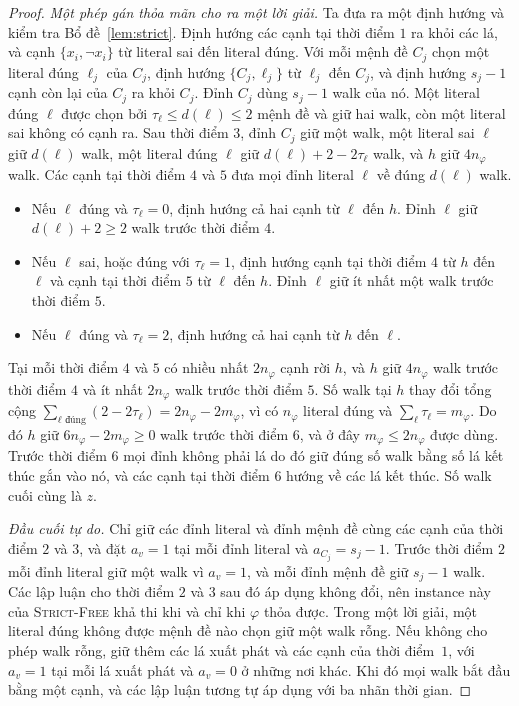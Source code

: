 \documentclass[pdflatex,sn-mathphys-num]{sn-jnl}
\theoremstyle{thmstyleone}%
\theoremstyle{thmstyletwo}%
\theoremstyle{thmstylethree}%
\newcommand{\SFREE}{\textup{\textsc{Strict-Free}}}
\begin{document}
\begin{proof}
\emph{Một phép gán thỏa mãn cho ra một lời giải.} Ta đưa ra một định hướng và kiểm tra Bổ đề~\ref{lem:strict}. Định hướng các cạnh tại thời điểm $1$ ra khỏi các lá, và cạnh $\{x_i,\lnot x_i\}$ từ literal sai đến literal đúng. Với mỗi mệnh đề $C_j$ chọn một literal đúng $\ell_j$ của $C_j$, định hướng $\{C_j,\ell_j\}$ từ $\ell_j$ đến $C_j$, và định hướng $s_j-1$ cạnh còn lại của $C_j$ ra khỏi $C_j$. Đỉnh $C_j$ dùng $s_j-1$ walk của nó. Một literal đúng $\ell$ được chọn bởi $\tau_\ell\le d(\ell)\le2$ mệnh đề và giữ hai walk, còn một literal sai không có cạnh ra. Sau thời điểm $3$, đỉnh $C_j$ giữ một walk, một literal sai $\ell$ giữ $d(\ell)$ walk, một literal đúng $\ell$ giữ $d(\ell)+2-2\tau_\ell$ walk, và $h$ giữ $4n_\varphi$ walk. Các cạnh tại thời điểm $4$ và $5$ đưa mọi đỉnh literal $\ell$ về đúng $d(\ell)$ walk.
\begin{itemize}
\item Nếu $\ell$ đúng và $\tau_\ell=0$, định hướng cả hai cạnh từ $\ell$ đến $h$. Đỉnh $\ell$ giữ $d(\ell)+2\ge2$ walk trước thời điểm $4$.
\item Nếu $\ell$ sai, hoặc đúng với $\tau_\ell=1$, định hướng cạnh tại thời điểm $4$ từ $h$ đến $\ell$ và cạnh tại thời điểm $5$ từ $\ell$ đến $h$. Đỉnh $\ell$ giữ ít nhất một walk trước thời điểm $5$.
\item Nếu $\ell$ đúng và $\tau_\ell=2$, định hướng cả hai cạnh từ $h$ đến $\ell$.
\end{itemize}
Tại mỗi thời điểm $4$ và $5$ có nhiều nhất $2n_\varphi$ cạnh rời $h$, và $h$ giữ $4n_\varphi$ walk trước thời điểm $4$ và ít nhất $2n_\varphi$ walk trước thời điểm $5$. Số walk tại $h$ thay đổi tổng cộng $\sum_{\ell\text{ đúng}}(2-2\tau_\ell)=2n_\varphi-2m_\varphi$, vì có $n_\varphi$ literal đúng và $\sum_\ell\tau_\ell=m_\varphi$. Do đó $h$ giữ $6n_\varphi-2m_\varphi\ge0$ walk trước thời điểm $6$, và ở đây $m_\varphi\le2n_\varphi$ được dùng. Trước thời điểm $6$ mọi đỉnh không phải lá do đó giữ đúng số walk bằng số lá kết thúc gắn vào nó, và các cạnh tại thời điểm $6$ hướng về các lá kết thúc. Số walk cuối cùng là $z$.

\emph{Đầu cuối tự do.} Chỉ giữ các đỉnh literal và đỉnh mệnh đề cùng các cạnh của thời điểm $2$ và $3$, và đặt $a_v=1$ tại mỗi đỉnh literal và $a_{C_j}=s_j-1$. Trước thời điểm $2$ mỗi đỉnh literal giữ một walk vì $a_v=1$, và mỗi đỉnh mệnh đề giữ $s_j-1$ walk. Các lập luận cho thời điểm $2$ và $3$ sau đó áp dụng không đổi, nên instance này của \SFREE{} khả thi khi và chỉ khi $\varphi$ thỏa được. Trong một lời giải, một literal đúng không được mệnh đề nào chọn giữ một walk rỗng. Nếu không cho phép walk rỗng, giữ thêm các lá xuất phát và các cạnh của thời điểm~$1$, với $a_v=1$ tại mỗi lá xuất phát và $a_v=0$ ở những nơi khác. Khi đó mọi walk bắt đầu bằng một cạnh, và các lập luận tương tự áp dụng với ba nhãn thời gian.
\end{proof}
\end{document}
